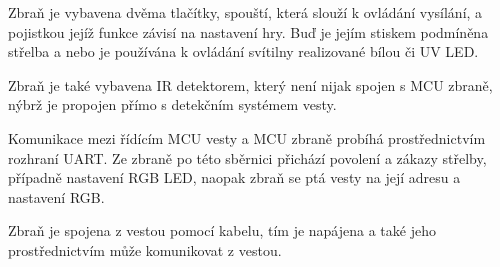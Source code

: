 Zbraň je vybavena dvěma tlačítky, spouští, která slouží k ovládání vysílání, a pojistkou jejíž funkce závisí na nastavení hry. Buď je jejím stiskem podmíněna střelba a nebo je používána k ovládání svítilny realizované bílou či UV LED.

Zbraň je také vybavena IR detektorem, který není nijak spojen s MCU zbraně, nýbrž je propojen přímo s detekčním systémem vesty.

Komunikace mezi řídícím MCU vesty a MCU zbraně probíhá prostřednictvím rozhraní UART. Ze zbraně po této sběrnici přichází povolení a zákazy střelby, případně nastavení RGB LED, naopak zbraň se ptá vesty na její adresu a nastavení RGB.

Zbraň je spojena z vestou pomocí kabelu, tím je napájena a také jeho prostřednictvím může komunikovat z vestou.

